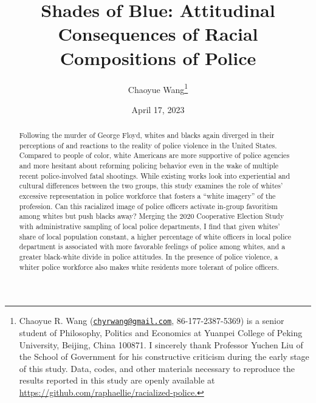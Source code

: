 \documentclass[
  12pt,
]{article}
\title{\textbf{Shades of Blue: Attitudinal Consequences of Racial
Compositions of Police}}
\author{Chaoyue Wang\footnote{Chaoyue R. Wang
  (\href{mailto:chyrwang@gmail.com}{\nolinkurl{chyrwang@gmail.com}},
  86-177-2387-5369) is a senior student of Philosophy, Politics and
  Economics at Yuanpei College of Peking University, Beijing, China
  100871. I sincerely thank Professor Yuchen Liu of the School of
  Government for his constructive criticism during the early stage of
  this study. Data, codes, and other materials necessary to reproduce
  the results reported in this study are openly available at
  \url{https://github.com/raphaellie/racialized-police.}}}
\date{April 17, 2023}
\begin{document}

\maketitle


\thispagestyle{empty}

\begin{abstract} 
\noindent %
Following the murder of George Floyd, whites and blacks again diverged
in their perceptions of and reactions to the reality of police violence
in the United States. Compared to people of color, white Americans are
more supportive of police agencies and more hesitant about reforming
policing behavior even in the wake of multiple recent police-involved
fatal shootings. While existing works look into experiential and
cultural differences between the two groups, this study examines the
role of whites' excessive representation in police workforce that
fosters a ``white imagery'' of the profession. Can this racialized image
of police officers activate in-group favoritism among whites but push
blacks away? Merging the 2020 Cooperative Election Study with
administrative sampling of local police departments, I find that given
whites' share of local population constant, a higher percentage of white
officers in local police department is associated with more favorable
feelings of police among whites, and a greater black-white divide in
police attitudes. In the presence of police violence, a whiter police
workforce also makes white residents more tolerant of police officers.
\end{abstract}

\begin{quote}
\end{quote}

\newpage \clearpage {}\captionsetup{font = small,labelfont = bf}

\ifdefined\Shaded\renewenvironment{Shaded}{\begin{tcolorbox}[interior hidden, breakable, borderline west={3pt}{0pt}{shadecolor}, frame hidden, sharp corners, enhanced, boxrule=0pt]}{\end{tcolorbox}}\fi
\end{document}
